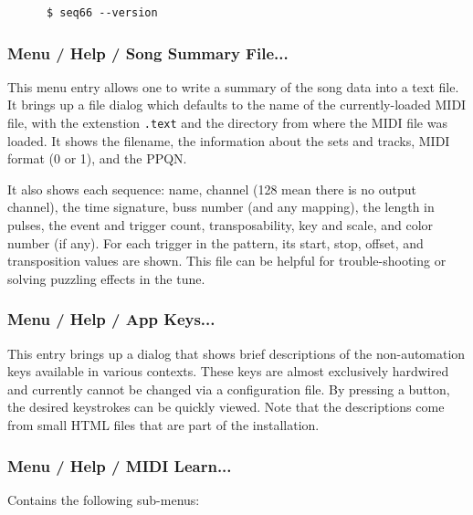    \begin{verbatim}
      $ seq66 --version
   \end{verbatim}

\subsubsection{Menu / Help / Song Summary File...}
\label{subsubsec:menu_help_song_summary_file}

   This menu entry allows one to write a summary of the song data into a text
   file. It brings up a file dialog which defaults to the name of the
   currently-loaded MIDI file, with the extenstion \texttt{.text} and
   the directory from where the MIDI file was loaded.
   It shows the filename, the information about the sets and tracks,
   MIDI format (0 or 1), and the PPQN.

   It also shows each sequence: name, channel (128 mean there is no output
   channel), the time signature, buss number (and any mapping), the length in
   pulses, the event and trigger count, transposability, key and scale, and
   color number (if any).
   For each trigger in the pattern, its start, stop, offset, and transposition
   values are shown.
   This file can be helpful for trouble-shooting or solving puzzling effects in
   the tune.

\subsubsection{Menu / Help / App Keys...}
\label{subsubsec:menu_help_app_keys}

   This entry brings up a dialog that shows brief descriptions of the
   non-automation keys available in various contexts.
   These keys are almost exclusively hardwired and currently cannot be
   changed via a configuration file.  By pressing a button, the desired
   keystrokes can be quickly viewed. Note that the descriptions come from small
   HTML files that are part of the installation.

\subsubsection{Menu / Help / MIDI Learn...}
\label{subsubsec:menu_help_midi_learn}

   Contains the following sub-menus:

